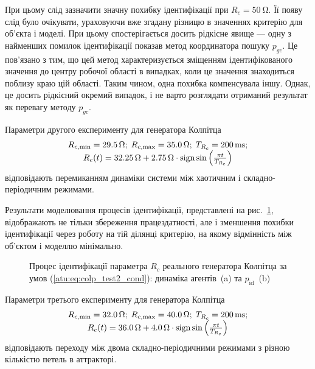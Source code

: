 При цьому слід зазначити значну похибку ідентифікації при
$R_c = \SI{50}{\ohm} $. Її появу слід було очікувати, ураховуючи вже
згадану різницю в значеннях критерію для об'єкта і моделі. При
цьому спостерігається досить рідкісне явище --- одну з найменших
помилок ідентифікації показав метод координатора пошуку
$p_{gc} $. Це пов'язано з тим, що цей метод характеризується
зміщенням ідентифікованого значення до центру робочої області в
випадках, коли це значення знаходиться
поблизу краю цій області. Таким чином, одна похибка компенсувала
іншу. Однак, це досить рідкісний окремий випадок, і не варто
розглядати отриманий результат як перевагу методу
$p_{gc}$.


Параметри другого експерименту для генератора Колпітца
%
\begin{equation}
  \begin{array}{c}
    R_{c,\min} = \SI{29.5}{\ohm};
    \;
    R_{c,\max} = \SI{35.0}{\ohm};
    \;
    T_{R_c} = \SI{200}{\milli\second};
  \\
    R_c(t) = \SI{32.25}{\ohm} + \SI{2.75}{\ohm} \cdot \operatorname*{sign} \sin \left( \frac{\pi t}{T_{R_c}}  \right)
  \end{array}
  \label{atu:eq:colp_test2_cond}
\end{equation}
%
відповідають перемиканням динаміки системи між хаотичним і
складно-періодичним режимами.

Результати моделювання процесів ідентифікації, представлені
на рис.~\ref{atu:f:colp_r_id_2}, відображають не тільки збереження
працездатності, але і зменшення похибки ідентифікації через
роботу на тій ділянці критерію, на якому відмінність між об'єктом
і моделлю мінімально.

\begin{figure}[htb!]
  \caption{Процес ідентифікації параметра $ R_c $ реального генератора Колпітца за умов (\ref{atu:eq:colp_test2_cond}): динаміка агентів~(a) та $p_\mathrm{id}$~(b)}
\label{atu:f:colp_r_id_2}
\end{figure}


Параметри третього експерименту для генератора Колпітца
%
\begin{equation}
  \begin{array}{c}
    R_{c,\min} = \SI{32.0}{\ohm};
    \;
    R_{c,\max} = \SI{40.0}{\ohm};
    \;
    T_{R_c} = \SI{200}{\milli\second};
  \\
    R_c(t) = \SI{36.0}{\ohm} + \SI{4.0}{\ohm} \cdot \operatorname*{sign} \sin \left(   \frac{\pi t}{T_{R_c}}   \right)
  \end{array}
  \label{atu:eq:colp_test3_cond}
\end{equation}
%
відповідають переходу між двома складно-періодичними режимами
з різною кількістю петель в аттракторі.

